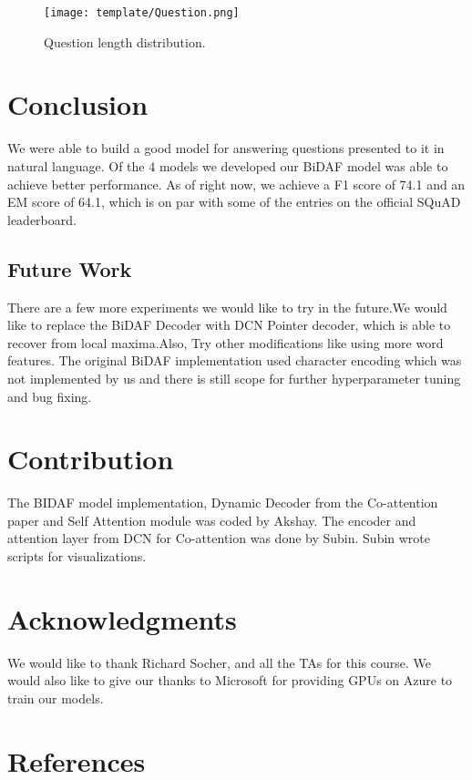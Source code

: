 \documentclass{article} %
\begin{document}
\begin{figure}
\texttt{[image: template/Question.png]}
\centering
\caption{Question length distribution.}
\end{figure}
 

\section{Conclusion}

We were able to build a good model for answering questions presented to it in natural language. Of the 4 models we developed our BiDAF model was able to achieve better performance.
As of right now, we achieve a F1 score of 74.1 and an EM score of 64.1, which is on par with some of the entries on the official SQuAD leaderboard.


\subsection*{Future Work}

There are a few more experiments we would like to try in the future.We would like to replace the BiDAF Decoder with DCN Pointer decoder, which is able to recover from local maxima.Also, Try other modifications like using more word features.
The original BiDAF implementation used character encoding which was not implemented by us and there is still scope for further hyperparameter
tuning and bug fixing.

\section{Contribution}
The BIDAF model implementation, Dynamic Decoder from the Co-attention paper and Self Attention module was coded by Akshay.
The encoder and attention layer from DCN for Co-attention was done by Subin. Subin wrote scripts for visualizations.

\section{Acknowledgments}

We would like to thank Richard Socher, and all the TAs for this course.
We would also like to give our thanks to Microsoft for providing GPUs on Azure to train our models.

\section*{References}
\end{document}
